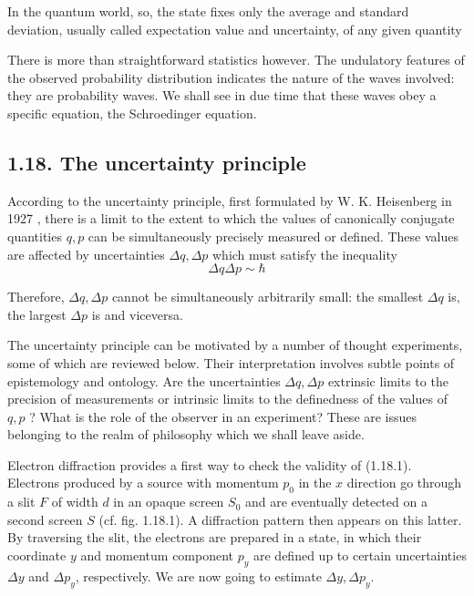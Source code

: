 \documentclass{article}
\begin{document}
In the quantum world, so, the state fixes only the average and standard deviation, usually called expectation value and uncertainty, of any given quantity

There is more than straightforward statistics however. The undulatory features of the observed probability distribution indicates the nature of the waves involved: they are probability waves. We shall see in due time that these waves obey a specific equation, the Schroedinger equation.

\subsection*{1.18. The uncertainty principle}

According to the uncertainty principle, first formulated by W. K. Heisenberg in 1927 , there is a limit to the extent to which the values of canonically conjugate quantities $q, p$ can be simultaneously precisely measured or defined. These values are affected by uncertainties $\Delta q, \Delta p$ which must satisfy the inequality
$$
\begin{equation*}
\Delta q \Delta p \sim \hbar \tag{1.18.1}
\end{equation*}
$$

Therefore, $\Delta q, \Delta p$ cannot be simultaneously arbitrarily small: the smallest $\Delta q$ is, the largest $\Delta p$ is and viceversa.

The uncertainty principle can be motivated by a number of thought experiments, some of which are reviewed below. Their interpretation involves subtle points of epistemology and ontology. Are the uncertainties $\Delta q, \Delta p$ extrinsic limits to the precision of measurements or intrinsic limits to the definedness of the values of $q, p$ ? What is the role of the observer in an experiment? These are issues belonging to the realm of philosophy which we shall leave aside.

Electron diffraction provides a first way to check the validity of (1.18.1). Electrons produced by a source with momentum $p_{0}$ in the $x$ direction go through a slit $F$ of width $d$ in an opaque screen $S_{0}$ and are eventually detected on a second screen $S$ (cf. fig. 1.18.1). A diffraction pattern then appears on this latter. By traversing the slit, the electrons are prepared in a state, in which their coordinate $y$ and momentum component $p_{y}$ are defined up to certain uncertainties $\Delta y$ and $\Delta p_{y}$, respectively. We are now going to estimate $\Delta y, \Delta p_{y}$.
\end{document}
